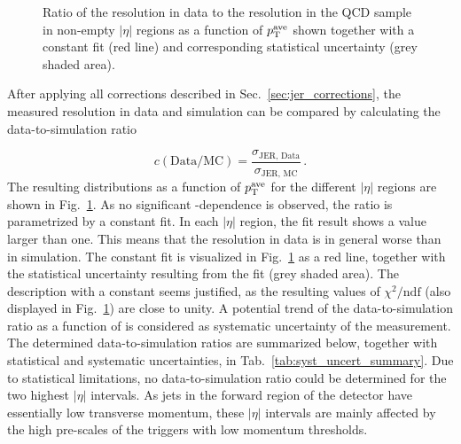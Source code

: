 \begin{figure}[!htp]
\begin{tabular}{cc}
  \end{tabular}
  \caption{Ratio of the resolution in data to the resolution in the \pythia QCD sample in non-empty $|\eta|$ regions as a function of $p_{\text{T}}^\mathrm{ave}$ shown together with a constant fit (red line) and corresponding statistical uncertainty (grey shaded area).}
  \label{fig:ratio}
\end{figure}
After applying all corrections described in Sec.~\ref{sec:jer_corrections}, the measured resolution in data and simulation can be compared by calculating the data-to-simulation ratio

\begin{equation}
  c(\mathrm{Data}/\mathrm{MC}) = \frac{ \sigma_\mathrm{JER,\, Data}}{ \sigma_\mathrm{JER,\, MC}} \, .
 \end{equation}
The resulting distributions as a function of $p_{\text{T}}^\mathrm{ave}$ for the different $|\eta|$ regions are shown in Fig.~\ref{fig:ratio}. As no significant \pt-dependence is observed, the ratio is parametrized by a constant fit. In each $|\eta|$ region, the fit result shows a value larger than one. This means that the resolution in data is in general worse than in simulation. The constant fit is visualized in Fig.~\ref{fig:ratio} as a red line, together with the statistical uncertainty resulting from the fit (grey shaded area). The description with a constant seems justified, as the resulting values of $\chi^2/\mathrm{ndf}$ (also displayed in Fig.~\ref{fig:ratio}) are close to unity. A potential trend of the data-to-simulation ratio as a function of \ptave is considered as systematic uncertainty of the measurement. The determined data-to-simulation ratios are summarized below, together with statistical and systematic uncertainties, in Tab.~\ref{tab:syst_uncert_summary}. Due to statistical limitations, no data-to-simulation ratio could be determined for the two highest $|\eta|$ intervals. As jets in the forward region of the detector have essentially low transverse momentum, these $|\eta|$ intervals are mainly affected by the high pre-scales of the triggers with low momentum thresholds.   
 
